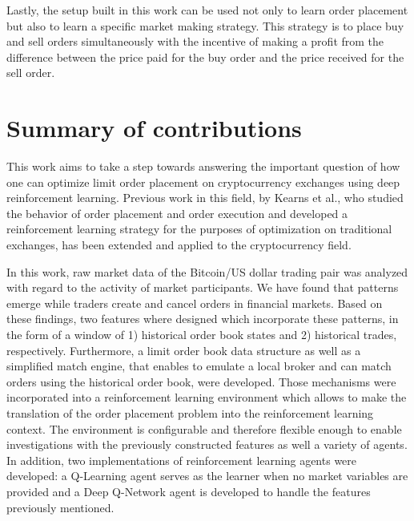 Lastly, the setup built in this work can be used not only to learn order placement but also to learn a specific market making\cite{o1986microeconomics} strategy.
This strategy is to place buy and sell orders simultaneously with the incentive of making a profit from the difference between the price paid for the buy order and the price received for the sell order.

\section{Summary of contributions}

This work aims to take a step towards answering the important question of how one can optimize limit order placement on cryptocurrency exchanges using deep reinforcement learning.
Previous work in this field, by Kearns et al., who studied the behavior of order placement and order execution\cite{nevmyvaka2005electronic} and developed a reinforcement learning strategy\cite{nevmyvaka2006reinforcement} for the purposes of optimization on traditional exchanges, has been extended and applied to the cryptocurrency field.

In this work, raw market data of the Bitcoin/US dollar trading pair was analyzed with regard to the activity of market participants.
We have found that patterns emerge while traders create and cancel orders in financial markets.
Based on these findings, two features where designed which incorporate these patterns, in the form of a window of 1) historical order book states and 2) historical trades, respectively.
Furthermore, a limit order book data structure as well as a simplified match engine, that enables to emulate a local broker and can match orders using the historical order book, were developed.
Those mechanisms were incorporated into a reinforcement learning environment which allows to make the translation of the order placement problem into the reinforcement learning context.
The environment is configurable and therefore flexible enough to enable investigations with the previously constructed features as well a variety of agents.
In addition, two implementations of reinforcement learning agents were developed: a Q-Learning agent serves as the learner when no market variables are provided and a Deep Q-Network agent is developed to handle the features previously mentioned.


